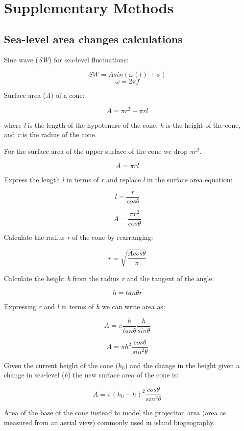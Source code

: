 
\section*{Supplementary Methods}
\label{supplementary_methods}

\subsection*{Sea-level area changes calculations}

Sine wave (\textit{SW}) for sea-level fluctuations:


\[ SW = A sin(\omega(t) + \phi) \]    
\[ \omega = 2 \pi f \]

Surface area (\textit{A}) of a cone:

\[ A = \pi r^2 + \pi r l \]

where \textit{l} is the length of the hypotenuse of the cone, \textit{h} is the height of the cone, and \textit{r} is the radius of the cone. 

For the surface area of the upper surface of the cone we drop $\pi r^2$.

\[ A = \pi r l \]

Express the length \textit{l} in terms of \textit{r} and replace \textit{l} in the surface area equation:

\[ l = \frac{r}{cos \theta} \]

\[ A = \frac{\pi r^2}{cos \theta} \]

Calculate the radius \textit{r} of the cone by rearranging: 

\[ r = \sqrt{\frac{A cos \theta}{\pi}} \]

Calculate the height \textit{h} from the radius \textit{r} and the tangent of the angle:

\[ h = tan \theta r \]

Expressing \textit{r} and \textit{l} in terms of \textit{h} we can write area as: 

\[ A = \pi \frac{h}{tan \theta} \frac{h}{sin \theta} \]

\[ A = \pi h^2 \frac{cos \theta}{sin^2 \theta} \]

Given the current height of the cone ($h_0$) and the change in the height given a change in sea-level (\textit{h}) the new surface area of the cone is:

\[ A = \pi (h_0 - h)^2 \frac{cos \theta}{sin^2 \theta} \]

Area of the base of the cone instead to model the projection area (area as measured from an aerial view) commonly used in island biogeography. \\

